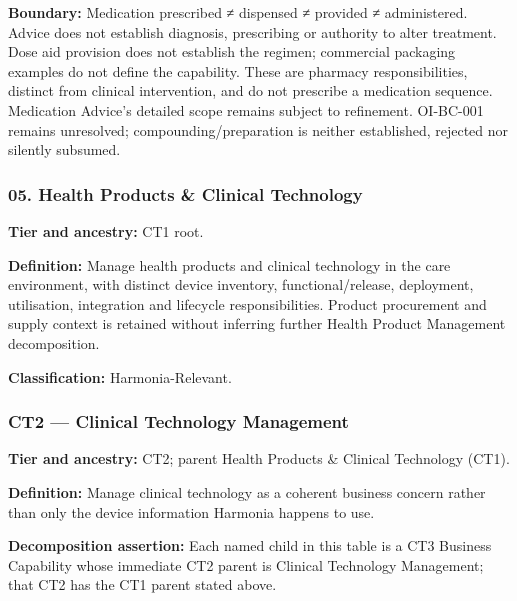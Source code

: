 \textbf{Boundary:} Medication prescribed ≠ dispensed ≠ provided ≠ administered. Advice does not establish diagnosis, prescribing or authority to alter treatment. Dose aid provision does not establish the regimen; commercial packaging examples do not define the capability. These are pharmacy responsibilities, distinct from clinical intervention, and do not prescribe a medication sequence. Medication Advice’s detailed scope remains subject to refinement. OI-BC-001 remains unresolved; compounding/\allowbreak{}preparation is neither established, rejected nor silently subsumed.

\label{rad:business:494}
\subsubsection*{05. Health Products \& Clinical Technology}
\label{rad:business:496}

\textbf{Tier and ancestry:} CT1 root.

\label{rad:business:498}

\textbf{Definition:} Manage health products and clinical technology in the care environment, with distinct device inventory, functional/\allowbreak{}release, deployment, utilisation, integration and lifecycle responsibilities. Product procurement and supply context is retained without inferring further Health Product Management decomposition.

\label{rad:business:500}

\textbf{Classification:} Harmonia-Relevant.

\label{rad:business:502}
\subsubsection*{CT2 — Clinical Technology Management}
\label{rad:business:504}

\textbf{Tier and ancestry:} CT2; parent Health Products \& Clinical Technology (CT1).

\label{rad:business:506}

\textbf{Definition:} Manage clinical technology as a coherent business concern rather than only the device information Harmonia happens to use.

\label{rad:business:508}

\textbf{Decomposition assertion:} Each named child in this table is a CT3 Business Capability whose immediate CT2 parent is Clinical Technology Management; that CT2 has the CT1 parent stated above.

